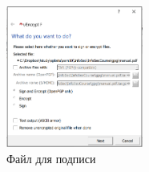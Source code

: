 \documentclass[10pt,a4paper]{article}
\begin{document}
\begin{figure}[h]
\begin{center}
\includegraphics[width=0.4\textwidth]{encrypt_1} %
\caption{Файл для подписи}
\label{fig:encrypt_1}
\end{center}
\end{figure}
\end{document}
